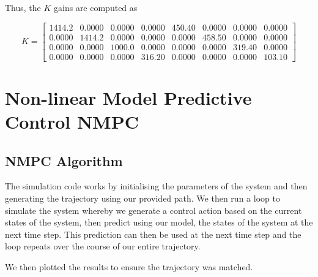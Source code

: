 \documentclass{UoNMCHA}
\numberwithin{equation}{section}
\begin{document}
	Thus, the ${K}$ gains are computed as
	
	\begin{equation}\label{eq/k_gain}
	K = 
	\begin{bmatrix}1414.2 & 0.0000 & 0.0000 & 0.0000 & 450.40 & 0.0000 & 0.0000 & 0.0000 \\ 0.0000 & 1414.2 & 0.0000 & 0.0000 & 0.0000 & 458.50 & 0.0000 & 0.0000 \\ 0.0000 & 0.0000 & 1000.0 & 0.0000 & 0.0000 & 0.0000 & 319.40 & 0.0000 \\ 0.0000 & 0.0000 & 0.0000 & 316.20 & 0.0000 & 0.0000 & 0.0000 & 103.10\end{bmatrix}
	\end{equation}
	
	\newpage
	
	\section{Non-linear Model Predictive Control NMPC}
	
	\subsection{NMPC Algorithm}
		
	The simulation code works by initialising the parameters of the system and then generating the trajectory using our provided path. We then run a loop to simulate the system whereby we generate a control action based on the current states of the system, then predict using our model, the states of the system at the next time step. This prediction can then be used at the next time step and the loop repeats over the course of our entire trajectory. \par
	
	We then plotted the results to ensure the trajectory was matched.
	
\end{document}
